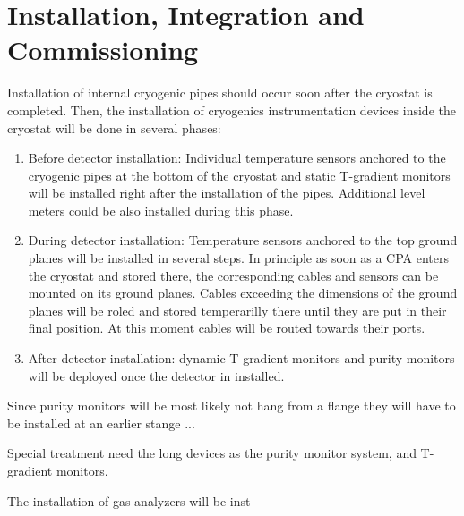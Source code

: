 \section{Installation, Integration and Commissioning}
\label{sec:fdsp-slow-cryo-install}

Installation of internal cryogenic pipes should occur soon after the cryostat is completed.
Then, the installation of cryogenics instrumentation devices inside the cryostat will be done in several phases:
\begin{enumerate}
\item Before detector installation: Individual temperature sensors anchored to the cryogenic pipes at the bottom of the cryostat and static T-gradient monitors
  will be installed right after the installation of the pipes. Additional level meters could be also installed during this phase. 
\item During detector installation: Temperature sensors anchored to the top ground planes will be installed in several steps.
  In principle as soon as a CPA enters the cryostat and stored there, the corresponding cables and sensors can be mounted on its ground planes. Cables exceeding the dimensions of
  the ground planes will be roled and stored temperarilly there until they are put in their final position. At this moment cables will be routed towards their ports.   
\item After detector installation: dynamic T-gradient monitors and purity monitors will be deployed  once the detector in installed. 
\end{enumerate}

Since purity monitors will be most likely not hang from a flange they will have to be installed at an earlier stange ... 


Special treatment need the long devices as the purity monitor system, and T-gradient monitors.

The installation of gas analyzers will be inst




